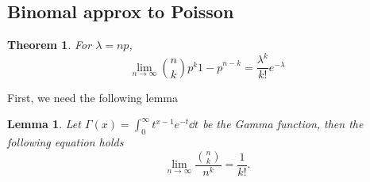 \documentclass[10pt]{article}
\theoremstyle{remark}
\theoremstyle{plain}
\newtheorem{Theorem}{Theorem}[section]
\newtheorem{Lemma}{Lemma}[section]
\numberwithin{equation}{section}
\begin{document}
\subsection{Binomal approx to Poisson}
\begin{Theorem}\label{binom_approx_poisosn}
	For $\lambda = np $,
	$$ \lim_{n  \to \infty} \binom{n}{k} p^k {1 - p}^{n - k} = \frac {\lambda^k} {k!} e^{-\lambda}$$
\end{Theorem}

First, we need the following lemma
\begin{Lemma}\label{inf_binom_over_power}
	Let $\Gamma(x) = \int_0^\infty t^{x-1} e^{-t} \dd{t}$ be the Gamma function, then the following equation holds
	\[
		\lim_{n \to \infty} \frac{\binom{n}{k}}{n^k} = \frac{1}{k!}.
	\]
\end{Lemma}
\end{document}
